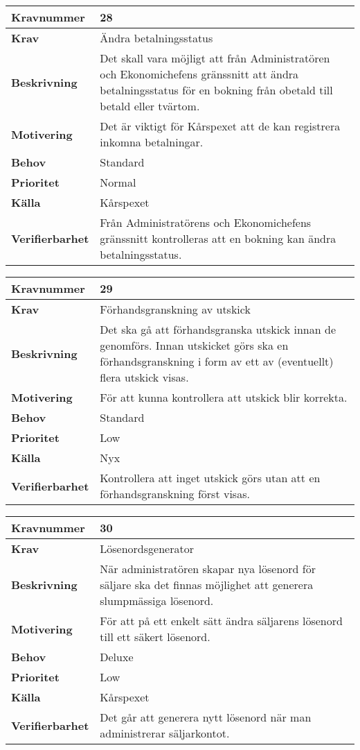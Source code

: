 \documentclass[a4paper, twoside, 11pt, titlepage]{article}
\begin{document}
\begin{tabular} { | p{3cm} | p{12.2cm} | }
	\hline
	\textbf{Kravnummer} & 28  \\
	\hline
	\textbf{Krav} & Ändra betalningsstatus  \\
	\hline
	\textbf{Beskrivning} & Det skall vara möjligt att från Administratören och Ekonomichefens gränssnitt att ändra betalningsstatus för en bokning från obetald till betald eller tvärtom.  \\
	\hline
	\textbf{Motivering} & Det är viktigt för Kårspexet att de kan registrera inkomna betalningar.  \\
	\hline
	\textbf{Behov} & Standard  \\
	\hline
	\textbf{Prioritet} & Normal  \\
	\hline
	\textbf{Källa} & Kårspexet  \\
	\hline
	\textbf{Verifierbarhet} & Från Administratörens och Ekonomichefens gränssnitt kontrolleras att en bokning kan ändra betalningsstatus.  \\
	\hline
\end{tabular}

\begin{tabular} { | p{3cm} | p{12.2cm} | }
	\hline
	\textbf{Kravnummer} & 29  \\
	\hline
	\textbf{Krav} & Förhandsgranskning av utskick  \\
	\hline
	\textbf{Beskrivning} & Det ska gå att förhandsgranska utskick innan de genomförs. Innan utskicket görs ska en förhandsgranskning i form av ett av (eventuellt) flera utskick visas.  \\
	\hline
	\textbf{Motivering} & För att kunna kontrollera att utskick blir korrekta.  \\
	\hline
	\textbf{Behov} & Standard  \\
	\hline
	\textbf{Prioritet} & Low  \\
	\hline
	\textbf{Källa} & Nyx  \\
	\hline
	\textbf{Verifierbarhet} & Kontrollera att inget utskick görs utan att en förhandsgranskning först visas.  \\
	\hline
\end{tabular}

\begin{tabular} { | p{3cm} | p{12.2cm} | }
	\hline
	\textbf{Kravnummer} & 30  \\
	\hline
	\textbf{Krav} & Lösenordsgenerator  \\
	\hline
	\textbf{Beskrivning} & När administratören skapar nya lösenord för säljare ska det finnas möjlighet att generera slumpmässiga lösenord.  \\
	\hline
	\textbf{Motivering} & För att på ett enkelt sätt ändra säljarens lösenord till ett säkert lösenord.  \\
	\hline
	\textbf{Behov} & Deluxe  \\
	\hline
	\textbf{Prioritet} & Low  \\
	\hline
	\textbf{Källa} & Kårspexet  \\
	\hline
	\textbf{Verifierbarhet} & Det går att generera nytt lösenord när man administrerar säljarkontot.  \\
	\hline
\end{tabular}
\end{document}
